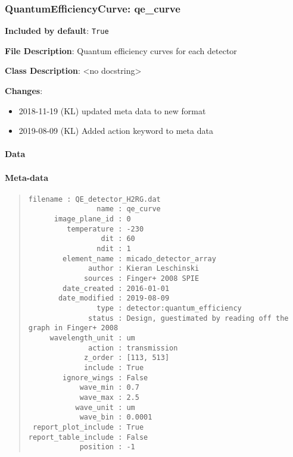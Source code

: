 \subsubsection{QuantumEfficiencyCurve: \textquotedbl{}qe\_curve\textquotedbl{}%
  \label{quantumefficiencycurve-qe-curve}%
}

\textbf{Included by default}: \texttt{True}

\textbf{File Description}: Quantum efficiency curves for each detector

\textbf{Class Description}: <no docstring>

\textbf{Changes}:

\begin{itemize}
\item 2018-11-19 (KL) updated meta data to new format

\item 2019-08-09 (KL) Added action keyword to meta data
\end{itemize}


\paragraph{Data%
  \label{id3}%
}

\begin{figure}[H]
\noindent{}\label{fig-qe-curve}
\end{figure}


\paragraph{Meta-data%
  \label{id4}%
}

\begin{quote}
\begin{alltt}
\begin{lstlisting}[frame=single]
            filename : QE_detector_H2RG.dat
                name : qe_curve
      image_plane_id : 0
         temperature : -230
                 dit : 60
                ndit : 1
        element_name : micado_detector_array
              author : Kieran Leschinski
             sources : Finger+ 2008 SPIE
        date_created : 2016-01-01
       date_modified : 2019-08-09
                type : detector:quantum_efficiency
              status : Design, guestimated by reading off the graph in Finger+ 2008
     wavelength_unit : um
              action : transmission
             z_order : [113, 513]
             include : True
        ignore_wings : False
            wave_min : 0.7
            wave_max : 2.5
           wave_unit : um
            wave_bin : 0.0001
 report_plot_include : True
report_table_include : False
            position : -1
\end{lstlisting}
\end{alltt}
\end{quote}



